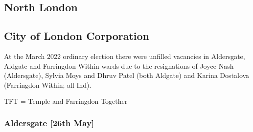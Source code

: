 \documentclass[a4paper,openany]{book}
\begin{document}
\begin{resultsiii}

%
%
%
%
%

\section{North London}

\subsection*{City of London Corporation}

At the March 2022 ordinary election there were unfilled vacancies in Aldersgate, Aldgate and Farringdon Within wards due to the resignations of Joyce Nash (Aldersgate), Sylvia Moys and Dhruv Patel (both Aldgate) and Karina Dostalova (Farringdon Within; all Ind).%
%
%

TFT = Temple and Farringdon Together

\subsubsection*{Aldersgate \hspace*{\fill}\nolinebreak[1]%
	\enspace\hspace*{\fill}
	[26th May]}



\end{resultsiii}
\end{document}
